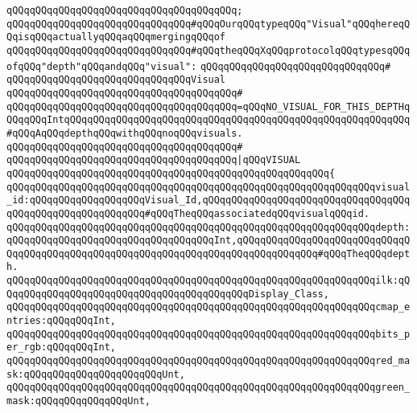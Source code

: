 \verb|qQQqqQQqqQQqqQQqqQQqqQQqqQQqqQQqqQQqqQQq;|\newline
\newline
\verb|qQQqqQQqqQQqqQQqqQQqqQQqqQQqqQQq#qQQqOurqQQqtypeqQQq"Visual"qQQqhereqQQqisqQQqactuallyqQQqaqQQqmergingqQQqof|\newline
\verb|qQQqqQQqqQQqqQQqqQQqqQQqqQQqqQQq#qQQqtheqQQqXqQQqprotocolqQQqtypesqQQqofqQQq"depth"qQQqandqQQq"visual":|\newline
\verb|qQQqqQQqqQQqqQQqqQQqqQQqqQQqqQQq#|\newline
\verb|qQQqqQQqqQQqqQQqqQQqqQQqqQQqqQQqVisual|\newline
\verb|qQQqqQQqqQQqqQQqqQQqqQQqqQQqqQQqqQQqqQQq#|\newline
\verb|qQQqqQQqqQQqqQQqqQQqqQQqqQQqqQQqqQQqqQQq=qQQqNO_VISUAL_FOR_THIS_DEPTHqQQqqQQqIntqQQqqQQqqQQqqQQqqQQqqQQqqQQqqQQqqQQqqQQqqQQqqQQqqQQqqQQqqQQq#qQQqAqQQqdepthqQQqwithqQQqnoqQQqvisuals.|\newline
\verb|qQQqqQQqqQQqqQQqqQQqqQQqqQQqqQQqqQQqqQQq#|\newline
\verb|qQQqqQQqqQQqqQQqqQQqqQQqqQQqqQQqqQQqqQQq|\verb#|qQQqVISUAL#\newline
\verb|qQQqqQQqqQQqqQQqqQQqqQQqqQQqqQQqqQQqqQQqqQQqqQQqqQQqqQQq{|\newline
\verb|qQQqqQQqqQQqqQQqqQQqqQQqqQQqqQQqqQQqqQQqqQQqqQQqqQQqqQQqqQQqqQQqvisual_id:qQQqqQQqqQQqqQQqqQQqVisual_Id,qQQqqQQqqQQqqQQqqQQqqQQqqQQqqQQqqQQqqQQqqQQqqQQqqQQqqQQqqQQq#qQQqTheqQQqassociatedqQQqvisualqQQqid.|\newline
\verb|qQQqqQQqqQQqqQQqqQQqqQQqqQQqqQQqqQQqqQQqqQQqqQQqqQQqqQQqqQQqqQQqdepth:qQQqqQQqqQQqqQQqqQQqqQQqqQQqqQQqqQQqInt,qQQqqQQqqQQqqQQqqQQqqQQqqQQqqQQqqQQqqQQqqQQqqQQqqQQqqQQqqQQqqQQqqQQqqQQqqQQqqQQqqQQq#qQQqTheqQQqdepth.|\newline
\verb|qQQqqQQqqQQqqQQqqQQqqQQqqQQqqQQqqQQqqQQqqQQqqQQqqQQqqQQqqQQqqQQqilk:qQQqqQQqqQQqqQQqqQQqqQQqqQQqqQQqqQQqqQQqqQQqDisplay_Class,|\newline
\verb|qQQqqQQqqQQqqQQqqQQqqQQqqQQqqQQqqQQqqQQqqQQqqQQqqQQqqQQqqQQqqQQqcmap_entries:qQQqqQQqInt,|\newline
\verb|qQQqqQQqqQQqqQQqqQQqqQQqqQQqqQQqqQQqqQQqqQQqqQQqqQQqqQQqqQQqqQQqbits_per_rgb:qQQqqQQqInt,|\newline
\verb|qQQqqQQqqQQqqQQqqQQqqQQqqQQqqQQqqQQqqQQqqQQqqQQqqQQqqQQqqQQqqQQqred_mask:qQQqqQQqqQQqqQQqqQQqqQQqUnt,|\newline
\verb|qQQqqQQqqQQqqQQqqQQqqQQqqQQqqQQqqQQqqQQqqQQqqQQqqQQqqQQqqQQqqQQqgreen_mask:qQQqqQQqqQQqqQQqUnt,|\newline
